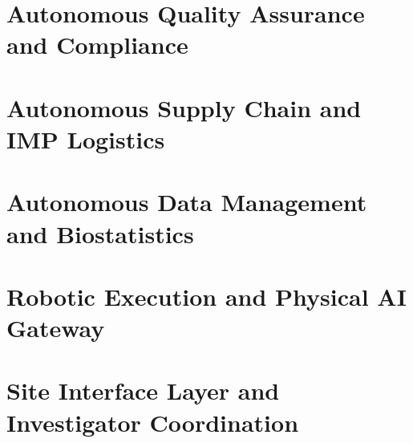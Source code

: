 \documentclass{article}
\begin{document}
\section{Autonomous Quality Assurance and Compliance}
\label{sec:quality}

\newpage

\section{Autonomous Supply Chain and IMP Logistics}
\label{sec:supply}

\newpage

\section{Autonomous Data Management and Biostatistics}
\label{sec:data}

\newpage

\section{Robotic Execution and Physical AI Gateway}
\label{sec:robotics}

\newpage

\section{Site Interface Layer and Investigator Coordination}
\label{sec:site-interface}

\newpage

\end{document}

